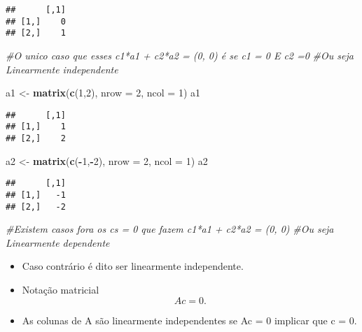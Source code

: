 \documentclass[
]{article}
\newenvironment{Shaded}{\begin{snugshade}}{\end{snugshade}}
\newcommand{\AttributeTok}[1]{\textcolor[rgb]{0.13,0.29,0.53}{#1}}
\newcommand{\CommentTok}[1]{\textcolor[rgb]{0.56,0.35,0.01}{\textit{#1}}}
\newcommand{\DecValTok}[1]{\textcolor[rgb]{0.00,0.00,0.81}{#1}}
\newcommand{\FunctionTok}[1]{\textcolor[rgb]{0.13,0.29,0.53}{\textbf{#1}}}
\newcommand{\NormalTok}[1]{#1}
\newcommand{\OtherTok}[1]{\textcolor[rgb]{0.56,0.35,0.01}{#1}}
\newcommand{\SpecialCharTok}[1]{\textcolor[rgb]{0.81,0.36,0.00}{\textbf{#1}}}
\providecommand{\tightlist}{%
  \setlength{\itemsep}{0pt}\setlength{\parskip}{0pt}}
\begin{document}
\begin{verbatim}
##      [,1]
## [1,]    0
## [2,]    1
\end{verbatim}

\begin{Shaded}
\begin{Highlighting}[]
\CommentTok{\#O unico caso que esses c1*a1 + c2*a2 = (0, 0) é se c1 = 0 E c2 =0}
\CommentTok{\#Ou seja Linearmente independente}

\NormalTok{a1 }\OtherTok{\textless{}{-}} \FunctionTok{matrix}\NormalTok{(}\FunctionTok{c}\NormalTok{(}\DecValTok{1}\NormalTok{,}\DecValTok{2}\NormalTok{), }\AttributeTok{nrow =} \DecValTok{2}\NormalTok{, }\AttributeTok{ncol =} \DecValTok{1}\NormalTok{)}
\NormalTok{a1}
\end{Highlighting}
\end{Shaded}

\begin{verbatim}
##      [,1]
## [1,]    1
## [2,]    2
\end{verbatim}

\begin{Shaded}
\begin{Highlighting}[]
\NormalTok{a2 }\OtherTok{\textless{}{-}} \FunctionTok{matrix}\NormalTok{(}\FunctionTok{c}\NormalTok{(}\SpecialCharTok{{-}}\DecValTok{1}\NormalTok{,}\SpecialCharTok{{-}}\DecValTok{2}\NormalTok{), }\AttributeTok{nrow =} \DecValTok{2}\NormalTok{, }\AttributeTok{ncol =} \DecValTok{1}\NormalTok{)}
\NormalTok{a2}
\end{Highlighting}
\end{Shaded}

\begin{verbatim}
##      [,1]
## [1,]   -1
## [2,]   -2
\end{verbatim}

\begin{Shaded}
\begin{Highlighting}[]
\CommentTok{\#Existem casos fora os cs = 0 que fazem c1*a1 + c2*a2 = (0, 0)}
\CommentTok{\#Ou seja Linearmente dependente}
\end{Highlighting}
\end{Shaded}

\begin{itemize}
\tightlist
\item
  Caso contrário é dito ser linearmente independente.
\item
  Notação matricial \[
  Ac = 0.
  \]
\item
  As colunas de A são linearmente independentes se Ac = 0 implicar que c
  = 0.
\end{itemize}
\end{document}
